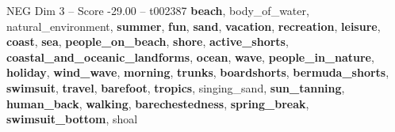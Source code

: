 \begin{textsample}{NEG Dim 3 – Score -29.00 – t002387}  \label{ex:f3_neg_007}
\textbf{beach}, body\_of\_water, natural\_environment, \textbf{summer}, \textbf{fun}, \textbf{sand}, \textbf{vacation}, \textbf{recreation}, \textbf{leisure}, \textbf{coast}, \textbf{sea}, \textbf{people\_on\_beach}, \textbf{shore}, \textbf{active\_shorts}, \textbf{coastal\_and\_oceanic\_landforms}, \textbf{ocean}, \textbf{wave}, \textbf{people\_in\_nature}, \textbf{holiday}, \textbf{wind\_wave}, \textbf{morning}, \textbf{trunks}, \textbf{boardshorts}, \textbf{bermuda\_shorts}, \textbf{swimsuit}, \textbf{travel}, \textbf{barefoot}, \textbf{tropics}, singing\_sand, \textbf{sun\_tanning}, \textbf{human\_back}, \textbf{walking}, \textbf{barechestedness}, \textbf{spring\_break}, \textbf{swimsuit\_bottom}, shoal

\end{textsample}
